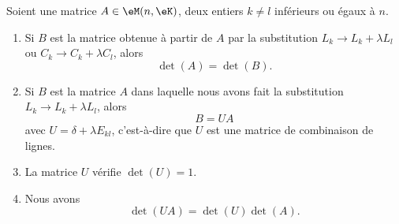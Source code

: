\begin{proposition}     \label{PROPooPYNHooLbeVhj}
    Soient une matrice \( A\in \eM(n,\eK)\), deux entiers \( k\neq l\) inférieurs ou égaux à \( n\).
    \begin{enumerate}
        \item       \label{ITEMooJSRDooTggEyO}
            Si \( B\) est la matrice obtenue à partir de \( A\) par la substitution \( L_k\to L_k+\lambda L_l\) ou \( C_k\to C_k+\lambda C_l\), alors
            \begin{equation}
                \det(A)=\det(B).
            \end{equation}
        \item   \label{ITEMooHKZWooVZDgnf}
            Si \( B\) est la matrice \( A\) dans laquelle nous avons fait la substitution \( L_k\to L_k+\lambda L_l\), alors
            \begin{equation}
                B=UA
            \end{equation}
            avec \( U=\delta+\lambda E_{kl}\), c'est-à-dire que \( U\) est une matrice de combinaison de lignes.
        \item           \label{ITEMooPGYJooWTTghT}
            La matrice \( U\) vérifie \( \det(U)=1\).
        \item       \label{ITEMooBBEAooZJVGNV}
            Nous avons 
            \begin{equation}
                \det(UA)=\det(U)\det(A).
            \end{equation}
    \end{enumerate}
\end{proposition}

